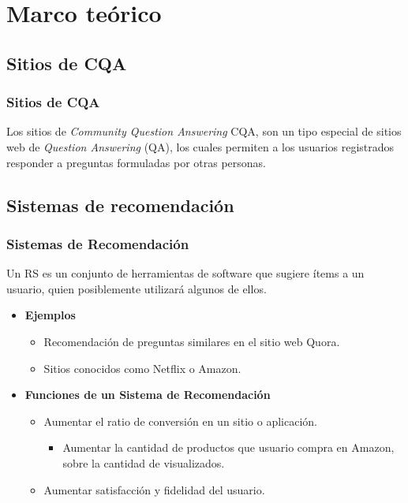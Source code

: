 \section{Marco teórico}
\subsection{Sitios de CQA}
\begin{frame}
	\frametitle{Sitios de CQA}
	\begin{tcolorbox}[colback=blue!5,colframe=blue!40!black,title=Sitios de Community Question Answering]
		Los sitios de \textit{Community Question Answering} CQA, son un tipo especial de sitios web de \textit{Question Answering} (QA), los cuales permiten a los usuarios registrados responder a preguntas formuladas por otras personas.
	\end{tcolorbox}
\end{frame}

\subsection{Sistemas de recomendación}
\begin{frame}
	\frametitle{Sistemas de Recomendación}
	\begin{tcolorbox}[colback=blue!5,colframe=blue!40!black,title=Sistemas de Recomendación]
		Un RS es un conjunto de herramientas de software que sugiere ítems a un usuario, quien posiblemente utilizará algunos de ellos.
	\end{tcolorbox}

	\bigskip
	\begin{itemize}
		\item
		\textbf{Ejemplos}
		\begin{itemize} [<*>]
			\item Recomendación de preguntas similares en el sitio web Quora.
			\item Sitios conocidos como Netflix o Amazon.
		\end{itemize}

		\bigskip

		\item
		\textbf{Funciones de un Sistema de Recomendación}
		\begin{itemize} [<*>]
			\item Aumentar el ratio de conversión en un sitio o aplicación.
			\begin{scriptsize}
				\begin{itemize} [<*>]
					\item Aumentar la cantidad de productos que usuario compra en Amazon, sobre la cantidad de visualizados.
				\end{itemize}
			\end{scriptsize}
			\item Aumentar satisfacción y fidelidad del usuario.
		\end{itemize}
	\end{itemize}
\end{frame}

